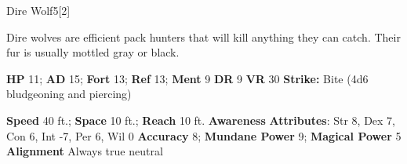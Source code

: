  \begin{monsection}{Dire Wolf}{5}[2]
    \vspace{-1em}\vspace{-1em}
    \vspace{0em}

    
      Dire wolves are efficient pack hunters that will kill anything they can catch.
      Their fur is usually mottled gray or black.
    
    

    \begin{spellcontent}
      \begin{spelltargetinginfo}
        \pari \textbf{HP} 11;
          \textbf{AD} 15;
          \textbf{Fort} 13;
          \textbf{Ref} 13;
          \textbf{Ment} 9
        \pari \textbf{DR} 9
        \pari \textbf{VR} 30
        \pari \textbf{Strike:}
            Bite  (4d6 bludgeoning and piercing)
      \end{spelltargetinginfo}
    \end{spellcontent}
    \begin{monsterfooter}
      \pari \textbf{Speed} 40 ft.;
        \textbf{Space} 10 ft.;
        \textbf{Reach} 10 ft.
      \pari \textbf{Awareness} 
      \pari \textbf{Attributes}:
        Str 8, Dex 7,
        Con 6, Int -7,
        Per 6, Wil 0
      \pari \textbf{Accuracy} 8;
        \textbf{Mundane Power} 9;
      \textbf{Magical Power} 5
      \pari \textbf{Alignment} Always true neutral
    \end{monsterfooter}
  \end{monsection}
  
